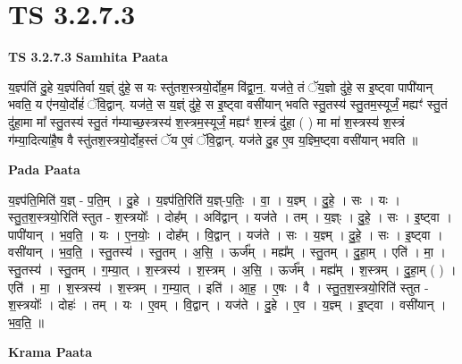\documentclass[17pt]{extarticle}
\begin{document}

\section{ TS 3.2.7.3 }

\textbf{TS 3.2.7.3 } \newline
\textbf{Samhita Paata} \newline

य॒ज्ञ्प॑तिं दु॒हे य॒ज्ञ्प॑तिर्वा य॒ज्ञ्ं दु॑हे॒ स यः स्तु॑तश॒स्त्रयो॒र्दोह॒म वि॑द्वा॒न॒. यज॑ते॒ तं ॅय॒ज्ञो दु॑हे॒ स इ॒ष्ट्वा पापी॑यान् भवति॒ य ए॑नयो॒र्दोहं॑ ॅवि॒द्वान्. यज॑ते॒ स य॒ज्ञ्ं दु॑हे॒ स इ॒ष्ट्वा वसी॑यान् भवति स्तु॒तस्य॑ स्तु॒तम॒स्यूर्जं॒ मह्यꣳ॑ स्तु॒तं दु॑हा॒मा मा᳚ स्तु॒तस्य॑ स्तु॒तं ग॑म्याच्छ॒स्त्रस्य॑ श॒स्त्रम॒स्यूर्जं॒ मह्यꣳ॑ श॒स्त्रं दु॑हा॒ ( ) मा मा॑ श॒स्त्रस्य॑ श॒स्त्रं ग॑म्या॒दित्या॑है॒ष वै स्तु॑तश॒स्त्रयो॒र्दोह॒स्तं ॅय ए॒वं ॅवि॒द्वान्. यज॑ते दु॒ह ए॒व य॒ज्ञ्मि॒ष्ट्वा वसी॑यान् भवति ॥ \newline

\textbf{Pada Paata} \newline

य॒ज्ञ्प॑ति॒मिति॑ य॒ज्ञ् - प॒ति॒म् । दु॒हे । य॒ज्ञ्प॑ति॒रिति॑ य॒ज्ञ्-प॒तिः॒ । वा॒ । य॒ज्ञ्म् । दु॒हे॒ । सः । यः । स्तु॒त॒श॒स्त्रयो॒रिति॑ स्तुत - श॒स्त्रयोः᳚ । दोह᳚म् । अवि॑द्वान् । यज॑ते । तम् । य॒ज्ञ्ः । दु॒हे॒ । सः । इ॒ष्ट्वा । पापी॑यान् । भ॒व॒ति॒ । यः । ए॒न॒योः॒ । दोह᳚म् । वि॒द्वान् । यज॑ते । सः । य॒ज्ञ्म् । दु॒हे॒ । सः । इ॒ष्ट्वा । वसी॑यान् । भ॒व॒ति॒ । स्तु॒तस्य॑ । स्तु॒तम् । अ॒सि॒ । ऊर्ज᳚म् । मह्य᳚म् । स्तु॒तम् । दु॒हा॒म् । एति॑ । मा॒ । स्तु॒तस्य॑ । स्तु॒तम् । ग॒म्या॒त् । श॒स्त्रस्य॑ । श॒स्त्रम् । अ॒सि॒ । ऊर्ज᳚म् । मह्य᳚म् । श॒स्त्रम् । दु॒हा॒म् ( ) । एति॑ । मा॒ । श॒स्त्रस्य॑ । श॒स्त्रम् । ग॒म्या॒त् । इति॑ । आ॒ह॒ । ए॒षः । वै । स्तु॒त॒श॒स्त्रयो॒रिति॑ स्तुत - श॒स्त्रयोः᳚ । दोहः॑ । तम् । यः । ए॒वम् । वि॒द्वान् । यज॑ते । दु॒हे । ए॒व । य॒ज्ञ्म् । इ॒ष्ट्वा । वसी॑यान् । भ॒व॒ति॒ ॥  \newline


\textbf{Krama Paata} \newline
\end{document}
